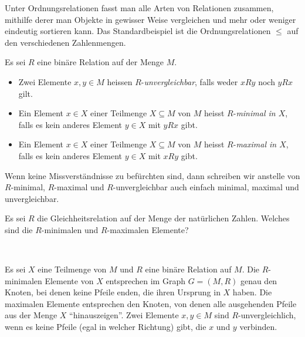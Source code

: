     Unter Ordnungsrelationen fasst man alle Arten von Relationen zusammen, mithilfe derer man
    Objekte in gewisser Weise vergleichen und mehr oder weniger eindeutig sortieren kann. Das
    Standardbeispiel ist die Ordnungsrelationen $\leq$ auf den verschiedenen Zahlenmengen.

    \begin{df}\label{df:minimale elemente}
    Es sei $R$ eine binäre Relation auf der Menge $M$.
    \begin{itemize}
    \item Zwei Elemente $x,y\in M$ heissen $R$-\textit{unvergleichbar}, falls weder $xRy$ noch $yRx$ gilt.
    \item Ein Element $x\in X$ einer Teilmenge $X\subseteq M$ von $M$ heisst $R$-\textit{minimal in $X$}, falls es kein anderes Element $y\in X$ mit $yRx$ gibt.
    \item  Ein Element $x\in X$ einer Teilmenge $X\subseteq M$ von $M$ heisst $R$-\textit{maximal in $X$}, falls es kein anderes Element $y\in X$ mit $xRy$ gibt.
    \end{itemize}
    Wenn keine Missverständnisse zu befürchten sind, dann schreiben wir anstelle von $R$-minimal, $R$-maximal und $R$-unvergleichbar auch einfach minimal, maximal und unvergleichbar.
    \end{df}

    \begin{ueb}
        Es sei $R$ die Gleichheitsrelation auf der Menge der natürlichen Zahlen. Welches sind die $R$-minimalen und $R$-maximalen Elemente?
    \end{ueb}
    \begin{lsg}~
    \end{lsg}

    \begin{rk}
        Es sei $X$ eine Teilmenge von $M$ und $R$ eine binäre Relation auf $M$.
        Die $R$-minimalen Elemente von $X$ entsprechen im Graph $G=(M,R)$ genau den Knoten, bei
        denen keine Pfeile enden, die ihren Ursprung in $X$ haben. Die maximalen Elemente
        entsprechen den Knoten, von denen alle ausgehenden Pfeile aus der Menge $X$
        ``hinauszeigen''. Zwei Elemente $x,y\in M$ sind $R$-unvergleichlich, wenn es keine
        Pfeile (egal in welcher Richtung) gibt, die $x$ und $y$ verbinden.
    \end{rk}

